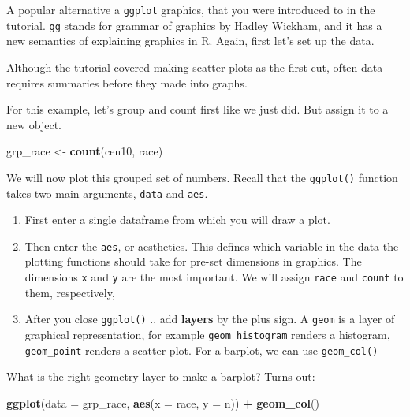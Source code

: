 \documentclass[]{book}
\newenvironment{Shaded}{\begin{snugshade}}{\end{snugshade}}
\newcommand{\DataTypeTok}[1]{\textcolor[rgb]{0.13,0.29,0.53}{#1}}
\newcommand{\KeywordTok}[1]{\textcolor[rgb]{0.13,0.29,0.53}{\textbf{#1}}}
\newcommand{\NormalTok}[1]{#1}
\newcommand{\OperatorTok}[1]{\textcolor[rgb]{0.81,0.36,0.00}{\textbf{#1}}}
\newcommand{\StringTok}[1]{\textcolor[rgb]{0.31,0.60,0.02}{#1}}
\providecommand{\tightlist}{%
  \setlength{\itemsep}{0pt}\setlength{\parskip}{0pt}}
\theoremstyle{definition}
\theoremstyle{definition}
\theoremstyle{definition}
\theoremstyle{remark}
\begin{document}
A popular alternative a \texttt{ggplot} graphics, that you were introduced to in the tutorial. \texttt{gg} stands for grammar of graphics by Hadley Wickham, and it has a new semantics of explaining graphics in R. Again, first let's set up the data.

Although the tutorial covered making scatter plots as the first cut, often data requires summaries before they made into graphs.

For this example, let's group and count first like we just did. But assign it to a new object.

\begin{Shaded}
\begin{Highlighting}[]
\NormalTok{grp_race <-}\StringTok{ }\KeywordTok{count}\NormalTok{(cen10, race)}
\end{Highlighting}
\end{Shaded}

We will now plot this grouped set of numbers. Recall that the \texttt{ggplot()} function takes two main arguments, \texttt{data} and \texttt{aes}.

\begin{enumerate}
\def\labelenumi{\arabic{enumi}.}
\tightlist
\item
  First enter a single dataframe from which you will draw a plot.
\item
  Then enter the \texttt{aes}, or aesthetics. This defines which variable in the data the plotting functions should take for pre-set dimensions in graphics. The dimensions \texttt{x} and \texttt{y} are the most important. We will assign \texttt{race} and \texttt{count} to them, respectively,
\item
  After you close \texttt{ggplot()} .. add \textbf{layers} by the plus sign. A \texttt{geom} is a layer of graphical representation, for example \texttt{geom\_histogram} renders a histogram, \texttt{geom\_point} renders a scatter plot. For a barplot, we can use \texttt{geom\_col()}
\end{enumerate}

What is the right geometry layer to make a barplot? Turns out:

\begin{Shaded}
\begin{Highlighting}[]
\KeywordTok{ggplot}\NormalTok{(}\DataTypeTok{data =}\NormalTok{ grp_race, }\KeywordTok{aes}\NormalTok{(}\DataTypeTok{x =}\NormalTok{ race, }\DataTypeTok{y =}\NormalTok{ n)) }\OperatorTok{+}\StringTok{ }\KeywordTok{geom_col}\NormalTok{()}
\end{Highlighting}
\end{Shaded}
\end{document}
